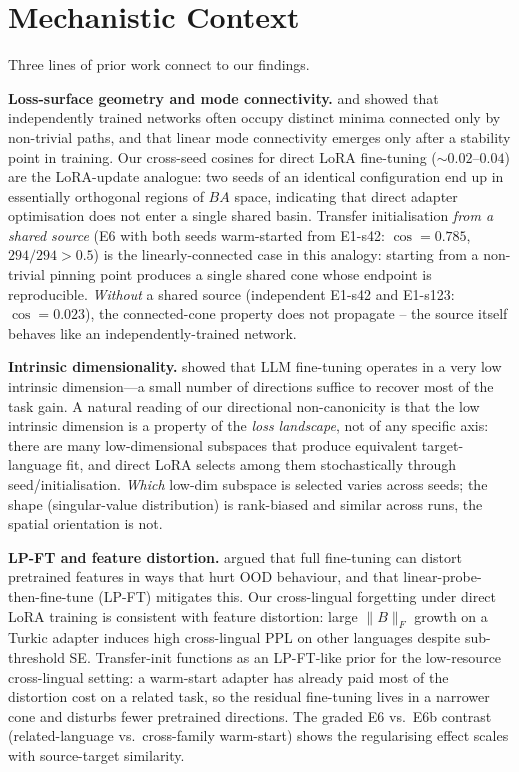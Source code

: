 \documentclass[11pt]{article}
\begin{document}
\section{Mechanistic Context}
\label{app:mechanistic}

Three lines of prior work connect to our findings.

\textbf{Loss-surface geometry and mode connectivity.} \citet{garipov2018loss} and \citet{frankle2020linear} showed that independently trained networks often occupy distinct minima connected only by non-trivial paths, and that linear mode connectivity emerges only after a stability point in training. Our cross-seed cosines for direct LoRA fine-tuning ($\sim 0.02$--$0.04$) are the LoRA-update analogue: two seeds of an identical configuration end up in essentially orthogonal regions of $BA$ space, indicating that direct adapter optimisation does not enter a single shared basin. Transfer initialisation \emph{from a shared source} (E6 with both seeds warm-started from E1-s42: $\cos = 0.785$, $294/294 > 0.5$) is the linearly-connected case in this analogy: starting from a non-trivial pinning point produces a single shared cone whose endpoint is reproducible. \emph{Without} a shared source (independent E1-s42 and E1-s123: $\cos = 0.023$), the connected-cone property does not propagate -- the source itself behaves like an independently-trained network.

\textbf{Intrinsic dimensionality.} \citet{aghajanyan2021intrinsic} showed that LLM fine-tuning operates in a very low intrinsic dimension---a small number of directions suffice to recover most of the task gain. A natural reading of our directional non-canonicity is that the low intrinsic dimension is a property of the \emph{loss landscape}, not of any specific axis: there are many low-dimensional subspaces that produce equivalent target-language fit, and direct LoRA selects among them stochastically through seed/initialisation. \emph{Which} low-dim subspace is selected varies across seeds; the shape (singular-value distribution) is rank-biased and similar across runs, the spatial orientation is not.

\textbf{LP-FT and feature distortion.} \citet{kumar2022finetuning} argued that full fine-tuning can distort pretrained features in ways that hurt OOD behaviour, and that linear-probe-then-fine-tune (LP-FT) mitigates this. Our cross-lingual forgetting under direct LoRA training is consistent with feature distortion: large $\|B\|_F$ growth on a Turkic adapter induces high cross-lingual PPL on other languages despite sub-threshold SE. Transfer-init functions as an LP-FT-like prior for the low-resource cross-lingual setting: a warm-start adapter has already paid most of the distortion cost on a related task, so the residual fine-tuning lives in a narrower cone and disturbs fewer pretrained directions. The graded E6 vs.\ E6b contrast (related-language vs.\ cross-family warm-start) shows the regularising effect scales with source-target similarity.
\end{document}
